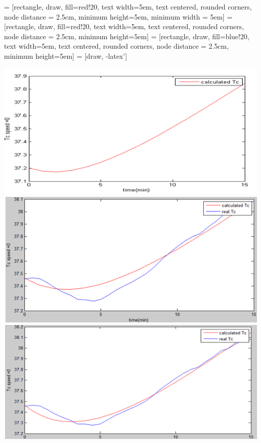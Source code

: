 \documentclass[landscape,paperwidth=42in,paperheight=52in,fontscale=0.27]{baposter} %
\begin{document}
\begin{poster}
{%
 = [rectangle, draw,  fill=red!20, text width=5em, text centered, rounded corners, node distance = 2.5cm, minimum height=5em, minimum width = 5em]
 = [rectangle, draw,   fill=red!20, text width=5em, text centered, rounded corners, node distance = 2.5cm, minimum height=5em]
 = [rectangle, draw, fill=blue!20, text width=5em, text centered, rounded corners, node distance = 2.5cm, minimum height=5em]
 = [draw, -latex']
\begin{center}
\end{center}
\begin{center}
\includegraphics[width=.26\linewidth]{sample.png}
\includegraphics[width=.25\linewidth]{sample2.png}
\includegraphics[width=.28\linewidth]{32best.png}
\end{center}

}
\end{poster}
\end{document}
